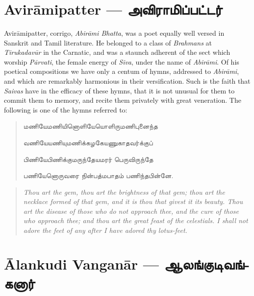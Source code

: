 \documentclass{article}
\newcommand{\TamilText}[1]{\texttamil{#1}}
\newcommand{\TamilBold}[1]{\texttamil{\textbf{#1}}}
\newcommand{\tam}[1]{\TamilText{#1}}
\newcommand{\tambold}[1]{\TamilBold{#1}}
\begin{document}
\section{Avir\={a}mipatter --- \tambold{அவிராமிப்பட்டர்}}
\paragraph{}
Avir\={a}mipatter, corrigo, \emph{Abir\={a}mi Bhatta}, was a poet equally well versed in Sanskrit and Tamil literature. He belonged to a class of \emph{Brahmans} at \emph{Tirukadav\={u}r} in the Carnatic, and was a staunch adherent of the sect which worship \emph{P\={a}rvati}, the female energy of \emph{Siva}, under the name of \emph{Abir\={a}mi}. Of his poetical compositions we have only a centum of hymns, addressed to \emph{Abir\={a}mi}, and which are remarkably harmonious in their versification. Such is the faith that \emph{Saivas} have in the efficacy of these hymns, that it is not unusual for them to commit them to memory, and recite them privately with great veneration. The following is one of the hymns referred to:
\begin{quotation}\small
\tam{மணியேமணியினொளியேயொளிருமணிபுனைந்த}

\tam{வணியேயணியுமணிக்கழகேயணுகாதவர்க்குப்‌}

\tam{பிணியேபிணிக்குமருந்தேயமரர்‌ பெருவிருந்தே}

\tam{பணியேனொருவரை நின்பத்மபாதம்‌ பணிந்தபின்னே}.
\end{quotation}
\begin{quotation}\small
\emph{Thou art the gem, thou art the brightness of that gem; thou art the necklace formed of that gem, and it is thou that givest it its beauty. Thou art the disease of those who do not approach thee, and the cure of those who approach thee; and thou art the great feast of the celestials. I shall not adore the feet of any after I have adored thy lotus-feet.}
\end{quotation}

\section{\={A}lankudi Vangan\={a}r --- \tambold{ஆலங்குடிவங்கனார்}}
\end{document}
